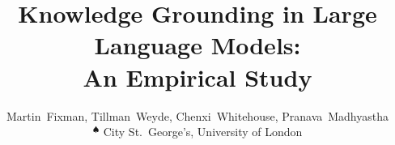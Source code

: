 \documentclass[a4paper,11pt]{article}
\title{Knowledge Grounding in Large Language Models: \\ An Empirical Study}
\author{%
	Martin~Fixman\spade{}, Tillman~Weyde\spade{}, Chenxi~Whitehouse\spade{}, Pranava~Madhyastha\spade{} \\
	$\phantom{}^\spadesuit{}$ City St.\ George's, University of London%
}
\begin{document}
\maketitle{}

\begin{abstract}
	
\end{abstract}













\appendix{}




\end{document}
